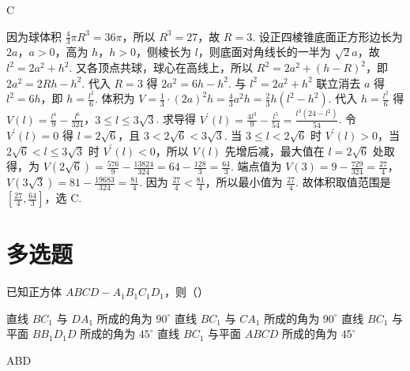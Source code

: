 \begin{answer}
C
\end{answer}

\begin{solution}

因为球体积 \(\frac43\pi R^3=36\pi\)，所以 \(R^3=27\)，故 \(R=3\). 设正四棱锥底面正方形边长为 \(2a\)，\(a>0\)，高为 \(h\)，\(h>0\)，侧棱长为 \(l\)，则底面对角线长的一半为 \(\sqrt{2}a\)，故 \(l^2=2a^2+h^2\). 又各顶点共球，球心在高线上，所以 \(R^2=2a^2+\left(h-R\right)^2\)，即 \(2a^2=2Rh-h^2\). 代入 \(R=3\) 得 \(2a^2=6h-h^2\). 与 \(l^2=2a^2+h^2\) 联立消去 \(a\) 得 \(l^2=6h\)，即 \(h=\frac{l^2}{6}\). 体积为 \(V=\frac13\cdot \left(2a\right)^2h=\frac43a^2h=\frac23h\left(l^2-h^2\right)\). 代入 \(h=\frac{l^2}{6}\) 得 \(V\left(l\right)=\frac{l^4}{9}-\frac{l^6}{324}\)，\(3\le l\le 3\sqrt{3}\). 求导得 \(V^{\prime}\left(l\right)=\frac{4l^3}{9}-\frac{l^5}{54}=\frac{l^3\left(24-l^2\right)}{54}\). 令 \(V^{\prime}\left(l\right)=0\) 得 \(l=2\sqrt{6}\)，且 \(3<2\sqrt{6}<3\sqrt{3}\). 当 \(3\le l<2\sqrt{6}\) 时 \(V^{\prime}\left(l\right)>0\)，当 \(2\sqrt{6}<l\le 3\sqrt{3}\) 时 \(V^{\prime}\left(l\right)<0\)，所以 \(V\left(l\right)\) 先增后减，最大值在 \(l=2\sqrt{6}\) 处取得，为 \(V\left(2\sqrt{6}\right)=\frac{576}{9}-\frac{13824}{324}=64-\frac{128}{3}=\frac{64}{3}\). 端点值为 \(V\left(3\right)=9-\frac{729}{324}=\frac{27}{4}\)，\(V\left(3\sqrt{3}\right)=81-\frac{19683}{324}=\frac{81}{4}\). 因为 \(\frac{27}{4}<\frac{81}{4}\)，所以最小值为 \(\frac{27}{4}\). 故体积取值范围是 \(\left[\frac{27}{4},\frac{64}{3}\right]\)，选 C.
\end{solution}
\section{多选题}

\begin{problem}
已知正方体 \(ABCD-A_1B_1C_1D_1\)，则（\quad）

\choices
    {直线 \(BC_1\) 与 \(DA_1\) 所成的角为 \(90^\circ\)}
    {直线 \(BC_1\) 与 \(CA_1\) 所成的角为 \(90^\circ\)}
    {直线 \(BC_1\) 与平面 \(BB_1D_1D\) 所成的角为 \(45^\circ\)}
    {直线 \(BC_1\) 与平面 \(ABCD\) 所成的角为 \(45^\circ\)}
\end{problem}

\begin{answer}
ABD
\end{answer}

